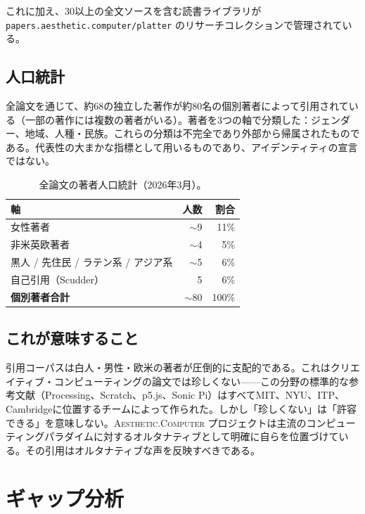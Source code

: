 \documentclass[10pt,letterpaper,twocolumn]{article}
\newcommand{\ac}{\textsc{Aesthetic.Computer}}
\begin{document}
これに加え、30以上の全文ソースを含む読書ライブラリが \texttt{papers.aesthetic.computer/platter} のリサーチコレクションで管理されている。

\subsection{人口統計}

全論文を通じて、約68の独立した著作が約80名の個別著者によって引用されている（一部の著作には複数の著者がいる）。著者を3つの軸で分類した：ジェンダー、地域、人種・民族。これらの分類は不完全であり外部から帰属されたものである。代表性の大まかな指標として用いるものであり、アイデンティティの宣言ではない。

\begin{table}[h]
\small
\centering
\begin{tabular}{lrr}
\toprule
\textbf{軸} & \textbf{人数} & \textbf{割合} \\
\midrule
女性著者 & $\sim$9 & 11\% \\
非米英欧著者 & $\sim$4 & 5\% \\
黒人 / 先住民 / ラテン系 / アジア系 & $\sim$5 & 6\% \\
自己引用（Scudder） & 5 & 6\% \\
\midrule
\textbf{個別著者合計} & $\sim$80 & 100\% \\
\bottomrule
\end{tabular}
\caption{全論文の著者人口統計（2026年3月）。}
\label{tab:demographics}
\end{table}

\subsection{これが意味すること}

引用コーパスは白人・男性・欧米の著者が圧倒的に支配的である。これはクリエイティブ・コンピューティングの論文では珍しくない——この分野の標準的な参考文献（Processing、Scratch、p5.js、Sonic Pi）はすべてMIT、NYU、ITP、Cambridgeに位置するチームによって作られた。しかし「珍しくない」は「許容できる」を意味しない。\ac{} プロジェクトは主流のコンピューティングパラダイムに対するオルタナティブとして明確に自らを位置づけている。その引用はオルタナティブな声を反映すべきである。


\section{ギャップ分析}
\end{document}

